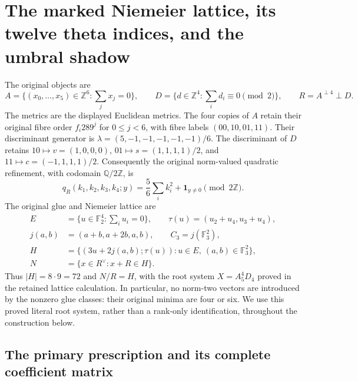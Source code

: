 
\section{The marked Niemeier lattice, its twelve theta indices, and the umbral shadow}
\label{nus:sec:shadow}

The original objects are
\[
 A=\{(x_0,\ldots,x_5)\in\mathbb Z^6:\sum_jx_j=0\},\qquad
 D=\{d\in\mathbb Z^4:\sum_id_i\equiv0\pmod2\},\qquad
 R=A^{\perp4}\perp D.
\]
The metrics are the displayed Euclidean metrics.  The four copies of $A$
retain their original fibre order $f_i289^j$ for $0\le j<6$, with fibre
labels $(00,10,01,11)$.  Their discriminant generator is
$\lambda=(5,-1,-1,-1,-1,-1)/6$.  The discriminant of $D$ retains
$10\mapsto v=(1,0,0,0)$, $01\mapsto s=(1,1,1,1)/2$, and
$11\mapsto c=(-1,1,1,1)/2$.  Consequently the original norm-valued
quadratic refinement, with codomain $\mathbb Q/2\mathbb Z$, is
\[
 q_R(k_1,k_2,k_3,k_4;y)
 =\frac56\sum_i k_i^2+\mathbf1_{y\ne0}\pmod{2\mathbb Z}.
\]
The original glue and Niemeier lattice are
\[
 \begin{split}
 E&=\{u\in\mathbb F_2^4:\sum_i u_i=0\},\qquad
 \tau(u)=(u_2+u_4,u_3+u_4),\\
 j(a,b)&=(a+b,a+2b,a,b),\qquad C_3=j(\mathbb F_3^2),\\
 H&=\{(3u+2j(a,b);\tau(u)):u\in E,\ (a,b)\in\mathbb F_3^2\},\\
 N&=\{x\in R^\vee:x+R\in H\}.
 \end{split}
\]
Thus $|H|=8\cdot9=72$ and $N/R=H$, with the root system
$X=A_5^4D_4$ proved in the retained lattice calculation.  In particular,
no norm-two vectors are introduced by the nonzero glue classes: their
original minima are four or six.  We use this proved literal root system,
rather than a rank-only identification, throughout the construction below.

\subsection{The primary prescription and its complete coefficient matrix}

